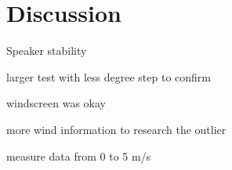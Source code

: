 \section{Discussion}\label{sec:discussion}

Speaker stability 

larger test with less degree step to confirm 

windscreen was okay 

more wind information to research the outlier 

measure data from 0 to 5 m/s

